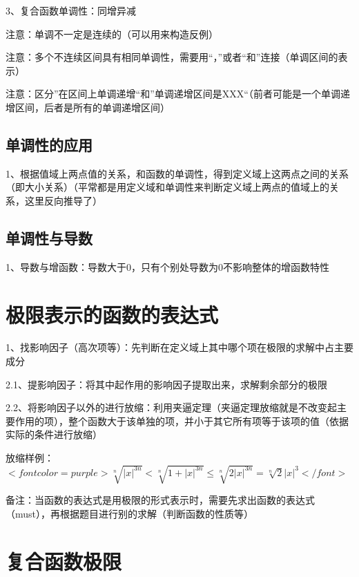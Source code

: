 3、复合函数单调性：同增异减

注意：单调不一定是连续的（可以用来构造反例）

注意：多个不连续区间具有相同单调性，需要用“，”或者“和”连接（单调区间的表示）

注意：区分”在区间上单调递增“和”单调递增区间是XXX“（前者可能是一个单调递增区间，后者是所有的单调递增区间）



\subsection{单调性的应用}

1、根据值域上两点值的关系，和函数的单调性，得到定义域上这两点之间的关系（即大小关系）（平常都是用定义域和单调性来判断定义域上两点的值域上的关系，这里反向推导了）



\subsection{单调性与导数}

1、导数与增函数：导数大于0，只有个别处导数为0不影响整体的增函数特性

\section{极限表示的函数的表达式}

1、找影响因子（高次项等）：先判断在定义域上其中哪个项在极限的求解中占主要成分

2.1、提影响因子：将其中起作用的影响因子提取出来，求解剩余部分的极限

2.2、将影响因子以外的进行放缩：利用夹逼定理（夹逼定理放缩就是不改变起主要作用的项），整个函数大于该单独的项，并小于其它所有项等于该项的值（依据实际的条件进行放缩）

放缩样例：$ <font color=purple>\sqrt[n]{|x|^{3 n}}<\sqrt[n]{1+|x|^{3 n}} \leqslant \sqrt[n]{2|x|^{3 n}}=\sqrt[n]{2}|x|^{3}</font> $

备注：当函数的表达式是用极限的形式表示时，需要先求出函数的表达式（must），再根据题目进行别的求解（判断函数的性质等）

\section{复合函数极限}

